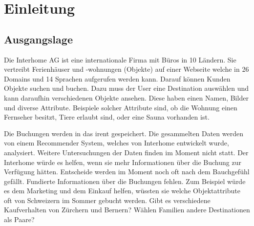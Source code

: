 
\chapter{Einleitung}
\label{sec:einleitung}
 
 


\section{Ausgangslage}
\label{sec:einleitung:ausgangslage}

Die Interhome AG ist eine internationale Firma mit Büros in 10 Ländern. Sie vertreibt Ferienhäuser und -wohnungen (Objekte) auf einer Webseite welche in 26 Domains und 14 Sprachen aufgerufen werden kann. Darauf können Kunden Objekte suchen und buchen. Dazu muss der User eine Destination auswählen und kann daraufhin verschiedenen Objekte ansehen. Diese haben einen Namen, Bilder und diverse Attribute. Beispiele solcher Attribute sind, ob die Wohnung einen Fernseher besitzt, Tiere erlaubt sind, oder eine Sauna vorhanden ist.

Die Buchungen werden in das \gls{irent} gespeichert. Die gesammelten Daten werden von einem Recommender System, welches von Interhome entwickelt wurde, analysiert. Weitere Untersuchungen der Daten finden im Moment nicht statt. Der Interhome würde es helfen, wenn sie mehr Informationen über die Buchung zur Verfügung hätten. Entscheide werden im Moment noch oft nach dem Bauchgefühl gefällt. Fundierte Informationen über die Buchungen fehlen. Zum Beispiel würde es dem Marketing und dem Einkauf helfen, wüssten sie welche Objektattribute oft von Schweizern im Sommer gebucht werden. Gibt es verschiedene Kaufverhalten von Zürchern und Bernern? Wählen Familien andere Destinationen als Paare?

